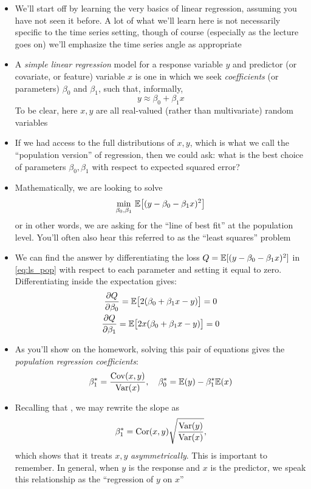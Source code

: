 \documentclass{article}
\begin{document}
\begin{itemize}
\item We'll start off by learning the very basics of linear regression, assuming
  you have not seen it before. A lot of what we'll learn here is not necessarily
  specific to the time series setting, though of course (especially as the
  lecture goes on) we'll emphasize the time series angle as appropriate

\item A \emph{simple linear regression} model for a response variable $y$ and
  predictor (or covariate, or feature) variable $x$ is one in which we seek
  \emph{coefficients} (or parameters) $\beta_0$ and $\beta_1$, such that,
  informally,  
  \[
  y \approx \beta_0 + \beta_1 x
  \]
  To be clear, here $x,y$ are all real-valued (rather than multivariate) random
  variables 

\item If we had access to the full distributions of $x,y$, which is what we call
  the ``population version'' of regression, then we could ask: what is the best
  choice of parameters $\beta_0,\beta_1$ with respect to expected squared error?  

\item Mathematically, we are looking to solve
  \begin{equation}
  \label{eq:ls_pop}
  \min_{\beta_0, \beta_1} \, \mathbb{E}\big[ (y - \beta_0 - \beta_1 x)^2 \big]
  \end{equation}
  or in other words, we are asking for the ``line of best fit'' at the
  population level. You'll often also hear this referred to as the ``least
  squares'' problem

\item We can find the answer by differentiating the loss $Q = \mathbb{E}[ (y - \beta_0 -
  \beta_1 x)^2]$ in \eqref{eq:ls_pop} with respect to each parameter and
  setting it equal to zero. Differentiating inside the expectation gives:  
  \begin{gather*}
  \frac{\partial Q}{\partial \beta_0} = \mathbb{E}\big[ 2(\beta_0 + \beta_1 x - y) 
  \big] = 0 \\ 
   \frac{\partial Q}{\partial \beta_1} = \mathbb{E}\big[ 2x (\beta_0 + \beta_1 x - y)
   \big] = 0  
  \end{gather*}
 
\item As you'll show on the homework, solving this pair of equations gives the 
  \emph{population regression coefficients}:
  \begin{equation}
  \label{eq:coef_pop}
  \beta^*_1 = \frac{\operatorname{Cov}(x, y)}{\operatorname{Var}(x)}, \quad 
  \beta^*_0 = \mathbb{E}(y) - \beta^*_1 \mathbb{E}(x)
  \end{equation}

\item Recalling that , 
  we may rewrite the slope as 
  \[
  \beta^*_1 = \operatorname{Cor}(x, y) \sqrt{\frac{\operatorname{Var}(y)}{\operatorname{Var}(x)}},
  \]
  which shows that it treats $x,y$ \emph{asymmetrically}. This is important to
  remember. In general, when $y$ is the response and $x$ is the predictor, we 
  speak this relationship as the ``regression of $y$ on $x$''
\end{itemize}
\end{document}
